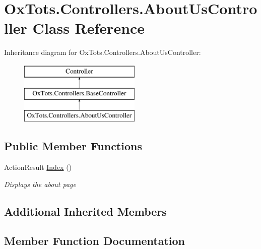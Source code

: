 \hypertarget{class_ox_tots_1_1_controllers_1_1_about_us_controller}{}\section{Ox\+Tots.\+Controllers.\+About\+Us\+Controller Class Reference}
\label{class_ox_tots_1_1_controllers_1_1_about_us_controller}
Inheritance diagram for Ox\+Tots.\+Controllers.\+About\+Us\+Controller\+:\begin{figure}[H]
\begin{center}
\leavevmode
\includegraphics[height=3.000000cm]{class_ox_tots_1_1_controllers_1_1_about_us_controller}
\end{center}
\end{figure}
\subsection*{Public Member Functions}
\begin{DoxyCompactItemize}
\item 
Action\+Result \mbox{\hyperlink{class_ox_tots_1_1_controllers_1_1_about_us_controller_ad7f4734c4294dca4ff007b6d86e9c2be}{Index}} ()
\begin{DoxyCompactList}\small\item\em Displays the about page \end{DoxyCompactList}\end{DoxyCompactItemize}
\subsection*{Additional Inherited Members}


\subsection{Member Function Documentation}
\mbox{\label{class_ox_tots_1_1_controllers_1_1_about_us_controller_ad7f4734c4294dca4ff007b6d86e9c2be}} 
